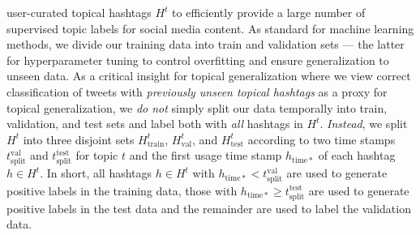 user-curated topical hashtags $H^t$ to efficiently provide a large number of
supervised topic labels for social media content.  
As standard for machine learning methods, we divide our training data into
train and validation sets --- the latter for hyperparameter tuning to control
overfitting and ensure generalization to unseen data.  
As a critical insight for topical generalization where we view correct classification 
of tweets with \emph{previously unseen topical hashtags} as a proxy for topical generalization, 
we \emph{do not} simply
split our data temporally into train, validation, and test sets and label both with \emph{all} 
hashtags in $H^t$.  \emph{Instead},
we split $H^t$ into three disjoint sets $H^t_\mathrm{train}$, $H^t_\mathrm{val}$, and 
$H^t_\mathrm{test}$ 
according to two time stamps $t^\mathrm{val}_\mathrm{split}$ and $t^\mathrm{test}_\mathrm{split}$ for topic $t$ and the first usage time stamp 
$h_\mathrm{time*}$ of each hashtag $h \in H^t$.  In short, all hashtags $h \in H^t$ with
$h_\mathrm{time*} < t^\mathrm{val}_\mathrm{split}$ are used to generate positive labels in the training data, those with $h_\mathrm{time*} \geq t^\mathrm{test}_\mathrm{split}$ are used to generate positive labels in the test data and the remainder are used to label the validation data.

